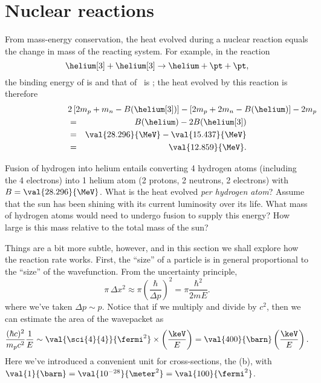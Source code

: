 \section{Nuclear reactions}

From mass-energy conservation, the heat evolved during a nuclear reaction equals the change in mass of the reacting system. For example, in the reaction
\[
	\helium[3] + \helium[3] \to \helium + \pt + \pt,
\]
the binding energy of \helium[3] is  and that of \helium\ is ; the heat evolved by this reaction is therefore
\begin{eqnarray*}
	\lefteqn{2\left[2m_{p}+m_{n}-B(\helium[3])\right] - \left[2m_{p}+2m_{n}-B(\helium)\right] - 2m_{p}} \\
	&=& B(\helium)-2B(\helium[3])\\
	&=& \val{28.296}{\MeV} - \val{15.437}{\MeV}\\ &=& \val{12.859}{\MeV}.
\end{eqnarray*}

\begin{exercisebox}
\label{ex.Q-hydrogen-helium}
Fusion of hydrogen into helium entails converting 4 hydrogen atoms (including the 4 electrons) into 1 helium atom (2 protons, 2 neutrons, 2 electrons) with $B = \val{28.296}{\MeV}$. What is the heat evolved \emph{per hydrogen atom}? Assume that the sun has been shining with its current luminosity over its life. What mass of hydrogen atoms would need to undergo fusion to supply this energy? How large is this mass relative to the total mass of the sun? 
\end{exercisebox}

 Things are a bit more subtle, however, and in this section we shall explore how the reaction rate works. First, the ``size'' of a particle is in general proportional to the ``size'' of the wavefunction. From the uncertainty principle, 
\[\pi\,\Delta x^{2} \approx \pi \left(\frac{\hbar}{\Delta p}\right)^{2} = \pi\frac{\hbar^{2}}{2mE}.\]
where we've taken $\Delta p\sim p$.
Notice that if we multiply and divide by $c^{2}$, then we can estimate the area of the wavepacket as
\[
	\frac{(\hbar c)^{2}}{m_{p} c^{2}} \frac{1}{E} \sim \val{\sci{4}{4}}{\fermi^{2}} \times \left(\frac{\keV}{E}\right) = \val{400}{\barn}\left(\frac{\keV}{E}\right).
\]	
Here we've introduced a convenient unit for cross-sections, the  (b), with $\val{1}{\barn} = \val{10^{-28}}{\meter^{2}} = \val{100}{\fermi^{2}}$.


